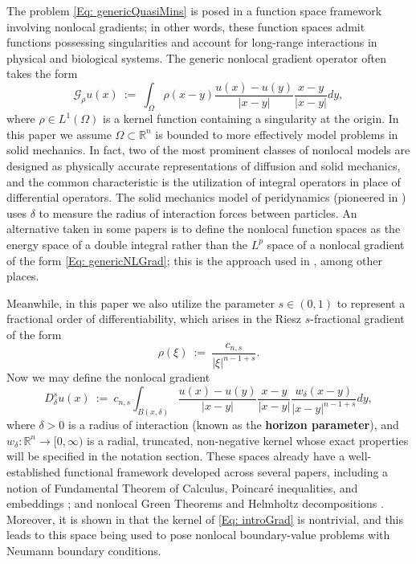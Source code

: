 \documentclass[11pt, reqno]{amsart}   	%
\theoremstyle{plain}
\numberwithin{equation}{section}
\def\de{\delta}
\def\Om{\Omega}
\def\R{\mathbb{R}}
\begin{document}
The problem  \eqref{Eq: genericQuasiMins} is posed in a function space framework involving nonlocal gradients; in other words, these function spaces admit functions possessing singularities and account for long-range interactions in physical and biological systems. The generic nonlocal gradient operator often takes the form
 \begin{equation}\label{Eq: genericNLGrad}
		\mathscr{G}_{\rho}u(x) \ := \ \int_{\Om}\rho(x - y)\frac{u(x) - u(y)}{|x - y|}  \frac{x - y}{|x - y|}dy,
	\end{equation}
	where $\rho \in L^1(\Om)$ is a kernel function containing a singularity at the origin. In this paper we assume $\Om \subset \R^n$ is bounded to more effectively model problems in solid mechanics. In fact, two of the most prominent classes of nonlocal models are designed as physically accurate representations of diffusion and solid mechanics, and the common characteristic is the utilization of integral operators in place of differential operators. The solid mechanics model of peridynamics (pioneered in \cite{silling2000reformulation, silling2007peridynamic, silling2005peridynamic}) uses $\de$ to measure the radius of interaction forces between particles.  An alternative taken in some papers is to define the nonlocal function spaces as the energy space of a double integral rather than the $L^p$ space of a nonlocal gradient of the form \eqref{Eq: genericNLGrad}; this is the approach used in \cite{bellido2014existence, mengesha2012nonlocal, mengesha2014bond, scott2019fractional}, among other places. 
    
    Meanwhile, in this paper we also utilize the parameter $s \in (0, 1)$ to represent a fractional order of differentiability, which arises in the Riesz $s$-fractional gradient of the form
    \begin{equation}\label{Eq: RieszKernel}
        \rho(\xi) \ := \ \frac{c_{n, s}}{|\xi|^{n - 1 + s}}.
    \end{equation}
    Now we may define the nonlocal gradient
    	\begin{equation}\label{Eq: introGrad}
		D^s_{\de}u(x) \ := \ c_{n, s}\int_{B(x, \de)}\frac{u(x) - u(y)}{|x - y|}  \frac{x - y}{|x - y|}\frac{w_{\de}(x - y)}{|x - y|^{n - 1 + s}}dy,
	\end{equation}
     where $\de > 0$ is a radius of interaction (known as the \textbf{horizon parameter}), and $w_{\de}: \R^n \rightarrow [0, \infty)$ is a radial, truncated, non-negative kernel whose exact properties will be specified in the notation section.  These spaces already have a well-established functional framework developed across several papers, including a notion of Fundamental Theorem of Calculus, Poincaré inequalities, and embeddings \cite{bellido2025nonlocal}; and nonlocal Green Theorems and Helmholtz decompositions \cite{bellido2024green}. Moreover, it is shown in \cite{kreisbeck2024non} that the kernel of \eqref{Eq: introGrad} is nontrivial, and this leads to this space being used to pose nonlocal boundary-value problems with Neumann boundary conditions. 
     
\end{document}
